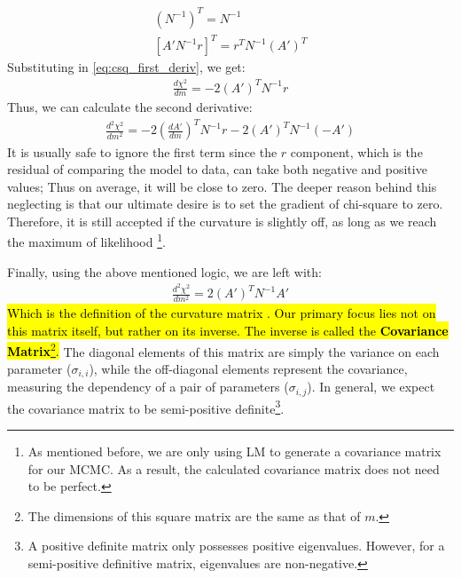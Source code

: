\documentclass[12pt, TexShade, letterpaper]{report}
\begin{document}
\begin{gather}
    \left(N^{-1}\right)^T = N^{-1}\\
    \left[A' N^{-1} r\right]^T = r^T N^{-1} \left(A'\right)^T
\end{gather}
Substituting in \ref{eq:csq_first_deriv}, we get:
\begin{align}
    \frac{d \chi^2}{dm} = -2 \left(A'\right)^T N^{-1} r
\end{align}
Thus, we can calculate the second derivative:
\begin{align}
    \frac{d^2 \chi^2}{dm^2} = -2 \left(\frac{dA'}{dm}\right)^T N^{-1} r -2 \left(A'\right) ^T N^{-1} \left(-A'\right)
\end{align}
It is usually safe to ignore the first term since the $r$ component, which is the residual of comparing the model to data, can take both negative and positive values; Thus on average, it will be close to zero. The deeper reason behind this neglecting is that our ultimate desire is to set the gradient of chi-square to zero. Therefore, it is still accepted if the curvature is slightly off, as long as we reach the maximum of likelihood \footnote{As mentioned before, we are only using LM to generate a covariance matrix for our MCMC. As a result, the calculated covariance matrix does not need to be perfect.}.\par

Finally, using the above mentioned logic, we are left with:
\begin{align}
         \frac{d^2 \chi^2}{dm^2} = 2 \left(A'\right)^T N^{-1} A' \label{eq:csq_second_deriv}
\end{align}
\hl{Which is the definition of the curvature matrix . Our primary focus lies not on this matrix itself, but rather on its inverse. The inverse is called the \textbf{Covariance Matrix}\footnote{The dimensions of this square matrix are the same as that of $m$.}.} The diagonal elements of this matrix are simply the variance on each parameter ($\sigma_{i, i}$), while the off-diagonal elements represent the covariance, measuring the dependency of a pair of parameters ($\sigma_{i, j}$). In general, we expect the covariance matrix to be semi-positive definite\footnote{A positive definite matrix only possesses positive eigenvalues. However, for a semi-positive definitive matrix, eigenvalues are non-negative.}.\par
\end{document}

